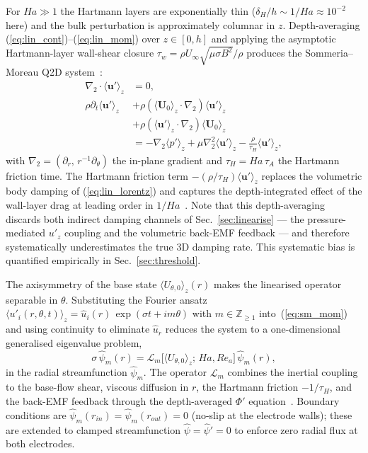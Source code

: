\documentclass[aps,prl,twocolumn,superscriptaddress]{revtex4-2}
\begin{document}
For $Ha\!\gg\!1$ the Hartmann layers are exponentially thin
($\delta_H/h \sim 1/Ha \approx 10^{-2}$ here) and the bulk
perturbation is approximately columnar in $z$.  Depth-averaging
(\ref{eq:lin_cont})--(\ref{eq:lin_mom}) over $z\in[0,h]$ and applying
the asymptotic Hartmann-layer wall-shear closure
$\tau_w = \rho U_\infty\sqrt{\mu\sigma B^{2}}/\rho$ produces the
Sommeria--Moreau Q2D system~\cite{9}:
\begin{align}
\nabla_{2}\!\cdot\!\langle\mathbf{u}'\rangle_{z} &= 0, \\
\rho\partial_t\langle\mathbf{u}'\rangle_{z}
&+ \rho(\langle\mathbf{U}_{0}\rangle_{z}\!\cdot\!\nabla_{2})
   \langle\mathbf{u}'\rangle_{z}
   \nonumber \\
&+ \rho(\langle\mathbf{u}'\rangle_{z}\!\cdot\!\nabla_{2})
   \langle\mathbf{U}_{0}\rangle_{z}
   \nonumber\\
&= -\nabla_{2}\langle p'\rangle_{z}
   + \mu\nabla_{2}^{2}\langle\mathbf{u}'\rangle_{z}
   - \frac{\rho}{\tau_{H}}\langle\mathbf{u}'\rangle_{z},
   \label{eq:sm_mom}
\end{align}
with $\nabla_{2} = (\partial_r,\, r^{-1}\partial_\theta)$ the in-plane
gradient and $\tau_{H} = Ha\,\tau_A$ the Hartmann friction time.  The
Hartmann friction term $-(\rho/\tau_H)\langle\mathbf{u}'\rangle_{z}$
replaces the volumetric body damping of (\ref{eq:lin_lorentz}) and
captures the depth-integrated effect of the wall-layer drag at
leading order in $1/Ha$~\cite{2}.  Note that this depth-averaging
discards both indirect damping channels of
Sec.~\ref{sec:linearise} --- the pressure-mediated $u'_z$ coupling
and the volumetric back-EMF feedback --- and therefore systematically
underestimates the true 3D damping rate.  This systematic bias is
quantified empirically in Sec.~\ref{sec:threshold}.

The axisymmetry of the base state $\langle U_{\theta,0}\rangle_{z}(r)$
makes the linearised operator separable in $\theta$.  Substituting the
Fourier ansatz
$\langle u'_{i}(r,\theta,t)\rangle_{z}
   = \hat{u}_{i}(r)\,\exp(\sigma t + i m\theta)$
with $m\!\in\!\mathbb{Z}_{\ge 1}$ into~(\ref{eq:sm_mom}) and using
continuity to eliminate $\hat{u}_r$ reduces the system to a
one-dimensional generalised eigenvalue problem,
\begin{equation}
\sigma\,\hat\psi_{m}(r) = \mathcal{L}_{m}\bigl[
   \langle U_{\theta,0}\rangle_{z};\,Ha,Re_{a}\bigr]\,\hat\psi_{m}(r),
\label{eq:eigenvalue}
\end{equation}
in the radial streamfunction $\hat\psi_{m}$.  The operator
$\mathcal{L}_{m}$ combines the inertial coupling to the base-flow
shear, viscous diffusion in $r$, the Hartmann friction $-1/\tau_H$,
and the back-EMF feedback through the depth-averaged $\Phi'$
equation~\cite{8}.  Boundary conditions are
$\hat\psi_{m}(r_{in}) = \hat\psi_{m}(r_{out}) = 0$ (no-slip at the
electrode walls); these are extended to clamped streamfunction
$\hat\psi = \hat\psi' = 0$ to enforce zero radial flux at both
electrodes.
\end{document}
